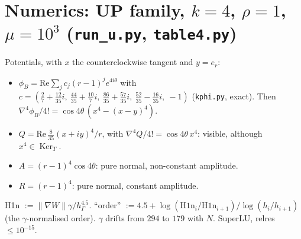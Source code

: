 \documentclass[11pt]{article}
\theoremstyle{remark}
\newcommand{\hG}{h_\Gamma}
\begin{document}
\section{Numerics: \textsf{UP} family, $k=4$, $\rho=1$, $\mu=10^3$ (\texttt{run\_u.py}, \texttt{table4.py})}
Potentials, with $x$ the counterclockwise tangent and $y=e_r$:
\begin{itemize}
\item $\phi_B=\mathrm{Re}\sum_jc_j(r-1)^je^{4i\theta}$ with $c=(\tfrac27+\tfrac{12}{35}i,\ \tfrac{44}{35}+\tfrac{10}7i,\
\tfrac{86}{35}+\tfrac{57}{35}i,\ \tfrac{52}{35}-\tfrac{16}{35}i,\ -1)$ (\texttt{kphi.py}, exact). Then
$\nabla^4\phi_B/4!=\cos4\theta\,(x^4-(x-y)^4)$.
\item $Q=\mathrm{Re}\,\tfrac8{35}(x+iy)^4/r$, with $\nabla^4Q/4!=\cos4\theta\,x^4$: visible, although $x^4\in\operatorname{Ker}_T$.
\item $A=(r-1)^4\cos4\theta$: pure normal, non-constant amplitude.
\item $R=(r-1)^4$: pure normal, constant amplitude.
\end{itemize}
H1n $:=\|\nabla W\|\gamma/\hG^{4.5}$. ``order'' $:=4.5+\log(\mathrm{H1n}_i/\mathrm{H1n}_{i+1})/\log(h_i/h_{i+1})$ (the $\gamma$-normalised
order). $\gamma$ drifts from $294$ to $179$ with $N$. SuperLU, relres $\le10^{-15}$.
\end{document}
